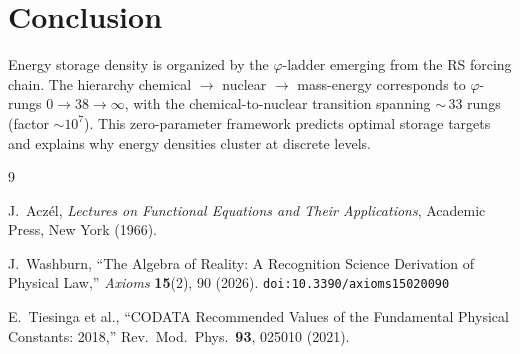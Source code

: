 \documentclass[12pt,a4paper]{article}
\theoremstyle{definition}
\theoremstyle{remark}
\begin{document}
\section{Conclusion}

Energy storage density is organized by the $\varphi$-ladder emerging from the 
RS forcing chain. The hierarchy chemical $\to$ nuclear $\to$ mass-energy corresponds 
to $\varphi$-rungs $0 \to 38 \to \infty$, with the chemical-to-nuclear
transition spanning ${\sim}\,33$ rungs (factor $\sim 10^7$). This zero-parameter framework predicts optimal 
storage targets and explains why energy densities cluster at discrete levels.

\begin{thebibliography}{9}

J.~Acz\'el, \emph{Lectures on Functional Equations and Their Applications},
Academic Press, New York (1966).

J.~Washburn, ``The Algebra of Reality: A Recognition Science Derivation
of Physical Law,'' \emph{Axioms} \textbf{15}(2), 90 (2026).
\texttt{doi:10.3390/axioms15020090}

E.~Tiesinga et al., ``CODATA Recommended Values of the Fundamental
Physical Constants: 2018,'' Rev.\ Mod.\ Phys.\ \textbf{93}, 025010 (2021).

\end{thebibliography}
\end{document}
